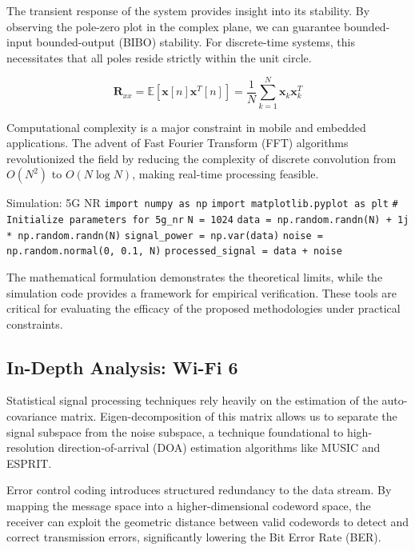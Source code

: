 The transient response of the system provides insight into its stability. By observing the pole-zero plot in the complex plane, we can guarantee bounded-input bounded-output (BIBO) stability. For discrete-time systems, this necessitates that all poles reside strictly within the unit circle.

\begin{equation}
    \mathbf{R}_{xx} = \mathbb{E}[\mathbf{x}[n]\mathbf{x}^T[n]] = \frac{1}{N} \sum_{k=1}^{N} \mathbf{x}_k \mathbf{x}_k^T
\end{equation}

Computational complexity is a major constraint in mobile and embedded applications. The advent of Fast Fourier Transform (FFT) algorithms revolutionized the field by reducing the complexity of discrete convolution from $O(N^2)$ to $O(N \log N)$, making real-time processing feasible.

\begin{pythonbox}{Simulation: 5G NR}
\texttt{import numpy as np}
\texttt{import matplotlib.pyplot as plt}
\texttt{}
\texttt{\# Initialize parameters for 5g\_nr}
\texttt{N = 1024}
\texttt{data = np.random.randn(N) + 1j * np.random.randn(N)}
\texttt{signal\_power = np.var(data)}
\texttt{noise = np.random.normal(0, 0.1, N)}
\texttt{processed\_signal = data + noise}
\end{pythonbox}

\vspace{0.5cm}
The mathematical formulation demonstrates the theoretical limits, while the simulation code provides a framework for empirical verification. These tools are critical for evaluating the efficacy of the proposed methodologies under practical constraints.


\subsection{In-Depth Analysis: Wi-Fi 6}
Statistical signal processing techniques rely heavily on the estimation of the auto-covariance matrix. Eigen-decomposition of this matrix allows us to separate the signal subspace from the noise subspace, a technique foundational to high-resolution direction-of-arrival (DOA) estimation algorithms like MUSIC and ESPRIT.

Error control coding introduces structured redundancy to the data stream. By mapping the message space into a higher-dimensional codeword space, the receiver can exploit the geometric distance between valid codewords to detect and correct transmission errors, significantly lowering the Bit Error Rate (BER).

